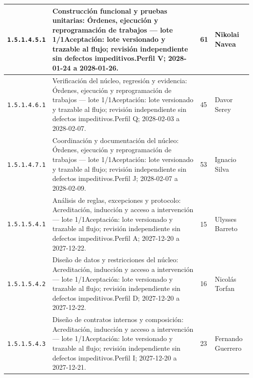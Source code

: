\begin{longtable}{L{29mm}L{80mm}R{12mm}L{28mm}}
\texttt{1.\allowbreak{}5.\allowbreak{}1.\allowbreak{}4.\allowbreak{}5.\allowbreak{}1} & Construcción funcional y pruebas unitarias: Órdenes, ejecución y reprogramación de trabajos — lote 1/1\newline Aceptación: lote versionado y trazable al flujo; revisión independiente sin defectos impeditivos.\newline Perfil V; 2028-01-24 a 2028-01-26. & 61 & Nikolai Navea\\\hline
\texttt{1.\allowbreak{}5.\allowbreak{}1.\allowbreak{}4.\allowbreak{}6.\allowbreak{}1} & Verificación del núcleo, regresión y evidencia: Órdenes, ejecución y reprogramación de trabajos — lote 1/1\newline Aceptación: lote versionado y trazable al flujo; revisión independiente sin defectos impeditivos.\newline Perfil Q; 2028-02-03 a 2028-02-07. & 45 & Davor Serey\\\hline
\texttt{1.\allowbreak{}5.\allowbreak{}1.\allowbreak{}4.\allowbreak{}7.\allowbreak{}1} & Coordinación y documentación del núcleo: Órdenes, ejecución y reprogramación de trabajos — lote 1/1\newline Aceptación: lote versionado y trazable al flujo; revisión independiente sin defectos impeditivos.\newline Perfil J; 2028-02-07 a 2028-02-09. & 53 & Ignacio Silva\\\hline
\texttt{1.\allowbreak{}5.\allowbreak{}1.\allowbreak{}5.\allowbreak{}4.\allowbreak{}1} & Análisis de reglas, excepciones y protocolo: Acreditación, inducción y acceso a intervención — lote 1/1\newline Aceptación: lote versionado y trazable al flujo; revisión independiente sin defectos impeditivos.\newline Perfil A; 2027-12-20 a 2027-12-22. & 15 & Ulysses Barreto\\\hline
\texttt{1.\allowbreak{}5.\allowbreak{}1.\allowbreak{}5.\allowbreak{}4.\allowbreak{}2} & Diseño de datos y restricciones del núcleo: Acreditación, inducción y acceso a intervención — lote 1/1\newline Aceptación: lote versionado y trazable al flujo; revisión independiente sin defectos impeditivos.\newline Perfil D; 2027-12-20 a 2027-12-22. & 16 & Nicolás Torfan\\\hline
\texttt{1.\allowbreak{}5.\allowbreak{}1.\allowbreak{}5.\allowbreak{}4.\allowbreak{}3} & Diseño de contratos internos y composición: Acreditación, inducción y acceso a intervención — lote 1/1\newline Aceptación: lote versionado y trazable al flujo; revisión independiente sin defectos impeditivos.\newline Perfil I; 2027-12-20 a 2027-12-21. & 23 & Fernando Guerrero\\\hline

\end{longtable}
